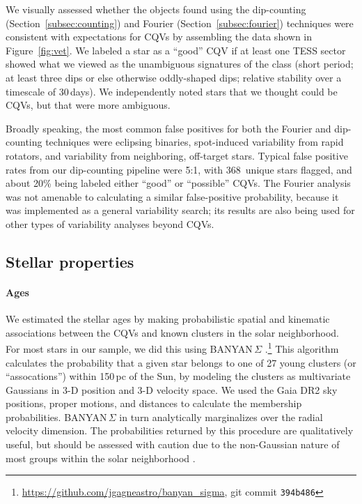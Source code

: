 \documentclass[11pt,twocolumn,tighten]{aastex63}
\newcommand{\nuniqdipflagged}{{368}} %
\begin{document}
We visually assessed whether the objects found using the dip-counting
(Section~\ref{subsec:counting}) and Fourier
(Section~\ref{subsec:fourier}) techniques were consistent with
expectations for CQVs by assembling the data shown in
Figure~\ref{fig:vet}.  We labeled a star as a ``good'' CQV if at least
one TESS sector showed what we viewed as the unambiguous signatures of
the class (short period; at least three dips or else otherwise
oddly-shaped dips; relative stability over a timescale of 30\,days).
We independently noted stars that we thought could be CQVs, but that
were more ambiguous.

Broadly speaking, the most common false positives for both the Fourier
and dip-counting techniques were eclipsing binaries, spot-induced
variability from rapid rotators, and variability from neighboring,
off-target stars.  Typical false positive rates from our dip-counting
pipeline were 5:1, with \nuniqdipflagged\ unique stars flagged, and
about 20\% being labeled either ``good'' or ``possible'' CQVs.  The
Fourier analysis was not amenable to calculating a similar
false-positive probability, because it was implemented as a general
variability search; its results are also being used for other types of
variability analyses beyond CQVs.


\subsection{Stellar properties}
\label{subsec:starprops}

\paragraph{Ages}
We estimated the stellar ages by making probabilistic spatial and
kinematic associations between the CQVs and known clusters in the
solar neighborhood.  For most stars in our sample, we did this using
BANYAN\,$\Sigma$
\citep{2018ApJ...856...23G}.\footnote{\url{https://github.com/jgagneastro/banyan_sigma},
git commit \texttt{394b486}} This algorithm calculates the probability
that a given star belongs to one of 27 young clusters (or
``assocations'') within 150\,pc of the Sun, by modeling the clusters
as multivariate Gaussians in 3-D position and 3-D velocity space.  We
used the Gaia DR2 sky positions, proper motions, and distances to
calculate the membership probabilities.  BANYAN\,$\Sigma$ in turn
analytically marginalizes over the radial velocity dimension.  The
probabilities returned by this procedure are qualitatively useful, but
should be assessed with caution due to the non-Gaussian nature of most
groups within the solar neighborhood \citep[see
e.g.][Figure~10]{2021ApJ...917...23K}.
\end{document}
